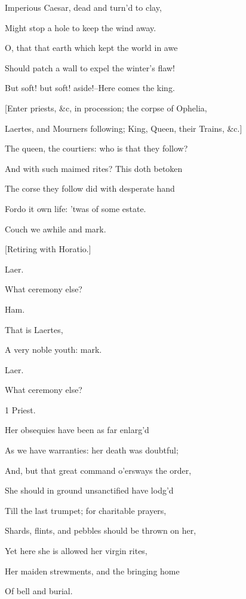 \documentclass[12pt]{book}
\begin{document}
   Imperious Caesar, dead and turn'd to clay,

   Might stop a hole to keep the wind away.

   O, that that earth which kept the world in awe

   Should patch a wall to expel the winter's flaw!

But soft! but soft! aside!--Here comes the king.



[Enter priests, \&c, in procession; the corpse of Ophelia,

Laertes, and Mourners following; King, Queen, their Trains, \&c.]



The queen, the courtiers: who is that they follow?

And with such maimed rites? This doth betoken

The corse they follow did with desperate hand

Fordo it own life: 'twas of some estate.

Couch we awhile and mark.



[Retiring with Horatio.]



Laer.

What ceremony else?



Ham.

That is Laertes,

A very noble youth: mark.



Laer.

What ceremony else?



1 Priest.

Her obsequies have been as far enlarg'd

As we have warranties: her death was doubtful;

And, but that great command o'ersways the order,

She should in ground unsanctified have lodg'd

Till the last trumpet; for charitable prayers,

Shards, flints, and pebbles should be thrown on her,

Yet here she is allowed her virgin rites,

Her maiden strewments, and the bringing home

Of bell and burial.
\end{document}
